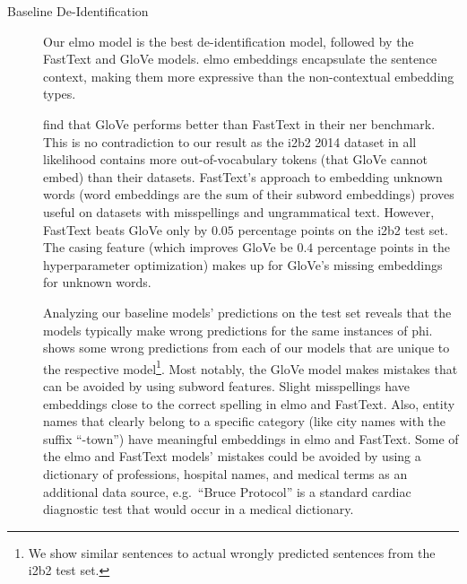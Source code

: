 \begin{description}
    \item[Baseline De-Identification]
    Our \ac{elmo} model is the best de-identification model, followed by the FastText and GloVe models.
    \Ac{elmo} embeddings encapsulate the sentence context, making them more expressive than the non-contextual embedding types.
    
    \citet{reimers2017optimal} find that GloVe performs better than FastText in their \ac{ner} benchmark.
    This is no contradiction to our result as the i2b2 2014 dataset in all likelihood contains more out-of-vocabulary tokens (that GloVe cannot embed) than their datasets.
    FastText's approach to embedding unknown words (word embeddings are the sum of their subword embeddings) proves useful on datasets with misspellings and ungrammatical text.
    However, FastText beats GloVe only by $0.05$ percentage points on the i2b2 test set.
    The casing feature (which improves GloVe be $0.4$ percentage points in the hyperparameter optimization) makes up for GloVe's missing embeddings for unknown words.
    
    Analyzing our baseline models' predictions on the test set reveals that the models typically make wrong predictions for the same instances of \ac{phi}.
     shows some wrong predictions from each of our models that are unique to the respective model\footnote{We show similar sentences to actual wrongly predicted sentences from the i2b2 test set.}.
    Most notably, the GloVe model makes mistakes that can be avoided by using subword features. 
    Slight misspellings have embeddings close to the correct spelling in \ac{elmo} and FastText.
    Also, entity names that clearly belong to a specific category (like city names with the suffix ``-town'') have meaningful embeddings in \ac{elmo} and FastText.
    Some of the \ac{elmo} and FastText models' mistakes could be avoided by using a dictionary of professions, hospital names, and medical terms as an additional data source, e.g.\ ``Bruce Protocol'' is a standard cardiac diagnostic test that would occur in a medical dictionary.
\end{description}

